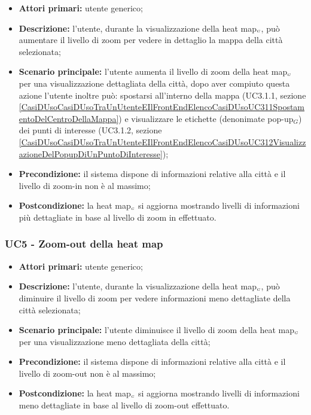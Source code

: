 \begin{itemize}
	\item \textbf{Attori primari:} utente generico;
	\item \textbf{Descrizione:} l’utente, durante la visualizzazione della heat map$_{\scaleto{G}{3pt}}$, può aumentare il livello di zoom per vedere in dettaglio la mappa della città selezionata;
	\item \textbf{Scenario principale:} l’utente aumenta il livello di zoom della heat map$_{\scaleto{G}{3pt}}$ per una visualizzazione dettagliata della città, dopo aver compiuto questa azione l'utente inoltre può: spostarsi all'interno della mappa (UC3.1.1, sezione \ref{CasiDUsoCasiDUsoTraUnUtenteEIlFrontEndElencoCasiDUsoUC311SpostamentoDelCentroDellaMappa}) e visualizzare le etichette (denonimate pop-up$_G$) dei punti di interesse (UC3.1.2, sezione \ref{CasiDUsoCasiDUsoTraUnUtenteEIlFrontEndElencoCasiDUsoUC312VisualizzazioneDelPopupDiUnPuntoDiInteresse});
	\item \textbf{Precondizione:} il sistema dispone di informazioni relative alla città e il livello di zoom-in non è al massimo;
	\item \textbf{Postcondizione:} la heat map$_{\scaleto{G}{3pt}}$ si aggiorna mostrando livelli di informazioni più dettagliate in base al livello di zoom in effettuato.
\end{itemize}

\subsubsection{UC5 - Zoom-out della heat map}\label{CasiDUsoCasiDUsoTraUnUtenteEIlFrontEndElencoCasiDUsoUC32ZoomOutDellaHeatMap}

\begin{itemize}
	\item \textbf{Attori primari:} utente generico;
	\item \textbf{Descrizione:} l’utente, durante la visualizzazione della heat map$_{\scaleto{G}{3pt}}$, può diminuire il livello di zoom per vedere informazioni meno dettagliate della città selezionata;
	\item \textbf{Scenario principale:} l’utente diminuisce il livello di zoom della heat map$_{\scaleto{G}{3pt}}$ per una visualizzazione meno dettagliata della città;
	\item \textbf{Precondizione:}  il sistema dispone di informazioni relative alla città e il livello di zoom-out non è al massimo;
	\item \textbf{Postcondizione:} la heat map$_{\scaleto{G}{3pt}}$ si aggiorna mostrando livelli di informazioni meno dettagliate in base al livello di zoom-out effettuato.
\end{itemize}


